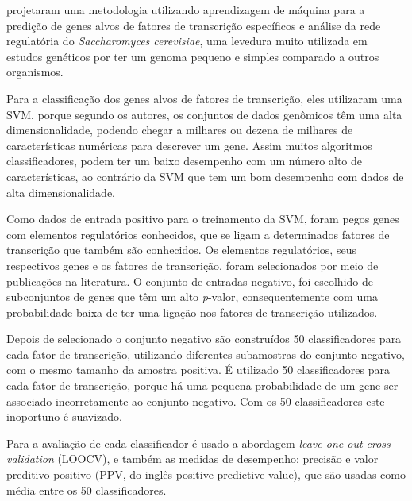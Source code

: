 
\cite{Holloway2008} projetaram uma metodologia utilizando aprendizagem de máquina para a predição de genes alvos de fatores de transcrição específicos e análise da rede regulatória do \textit{Saccharomyces cerevisiae}, uma levedura muito utilizada em estudos genéticos por ter um genoma pequeno e simples comparado a outros organismos.

Para a classificação dos genes alvos de fatores de transcrição, eles utilizaram uma SVM, porque segundo os autores, os conjuntos de dados genômicos têm uma alta dimensionalidade, podendo chegar a milhares ou dezena de milhares de características numéricas para descrever um gene. Assim muitos algoritmos classificadores, podem ter um baixo desempenho com um número alto de características, ao contrário da SVM que tem um bom desempenho com dados de alta dimensionalidade.

Como dados de entrada positivo para o treinamento da SVM, foram pegos genes com elementos regulatórios conhecidos, que se ligam a determinados fatores de transcrição que também são conhecidos. Os elementos regulatórios, seus respectivos genes e os fatores de transcrição, foram selecionados por meio de publicações na literatura. O conjunto de entradas negativo, foi escolhido de subconjuntos de genes que têm um alto \textit{p}-valor, consequentemente com uma probabilidade baixa de ter uma ligação nos fatores de transcrição utilizados.

Depois de selecionado o conjunto negativo são construídos 50 classificadores para cada fator de transcrição, utilizando diferentes subamostras do conjunto negativo, com o mesmo tamanho da amostra positiva. É utilizado 50 classificadores para cada fator de transcrição, porque há uma pequena probabilidade de um gene ser associado incorretamente ao conjunto negativo. Com os 50 classificadores este inoportuno é suavizado.

Para a avaliação de cada classificador é usado a abordagem  \textit{leave-one-out cross-validation} (LOOCV), e também as medidas de desempenho: precisão e valor preditivo positivo (PPV, do inglês positive predictive value), que são usadas como média entre os 50 classificadores.

